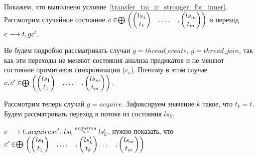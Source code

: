 Покажем, что выполнено условие~\ref{transfer_tm_ir_stronger_for_inner}. 
Рассмотрим случайное состояние $c \in \mathrel{\bigoplus}
\begin{pmatrix}
\begin{pmatrix}
ls_1 \\
t_1 
\end{pmatrix}& ,
\dots& ,
\begin{pmatrix}
ls_m \\
t_m 
\end{pmatrix}
\end{pmatrix}$ и переход $c \longrightarrow{t, g} c'$.

Не будем подробно рассматривать случаи $g = thread\_create$, $g = thread\_join$, так как эти переходы не меняют состояния анализа предикатов и не меняют состояние примитивов синхронизации ($c_s$). Поэтому в этом случае $c, c' \in \mathrel{\bigoplus}
\begin{pmatrix}
\begin{pmatrix}
ls_1 \\
t_1 
\end{pmatrix}& ,
\dots& ,
\begin{pmatrix}
ls_m \\
t_m 
\end{pmatrix}
\end{pmatrix}$.

Рассмотрим теперь случай $g = acquire$. Зафиксируем значение $k$ такое, что $t_k = t$. Будем рассматривать переход в потоке из состояния $ls_k$.

$c \longrightarrow{t, acquire s} c'$, $ls_k \stackrel{acquire s}{\leadsto} ls_k'$, нужно показать, что 
$c' \in \mathrel{\bigoplus}
\begin{pmatrix}
\begin{pmatrix}
ls_1 \\
t_1 
\end{pmatrix}& ,
\dots& ,
\begin{pmatrix}
ls_k' \\
t_k 
\end{pmatrix}
\dots& ,
\begin{pmatrix}
ls_m \\
t_m 
\end{pmatrix}
\end{pmatrix}$

